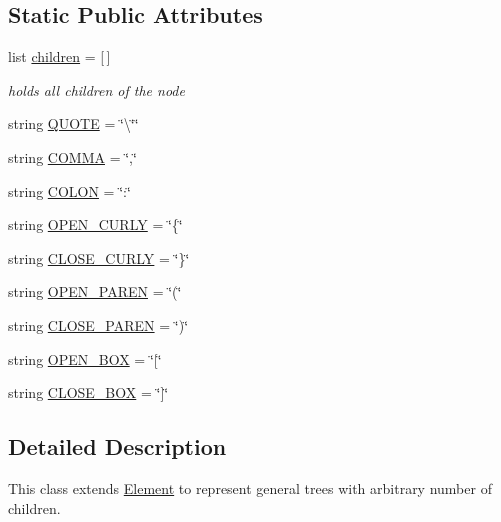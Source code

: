 \subsection*{Static Public Attributes}
\begin{DoxyCompactItemize}
\item 
list \hyperlink{class_tree_element_1_1_tree_element_ae0cb830d32da4af3e42635bc541c0d5d}{children} = \mbox{[}$\,$\mbox{]}
\begin{DoxyCompactList}\small\item\em holds all children of the node \end{DoxyCompactList}\item 
string \hyperlink{class_tree_element_1_1_tree_element_a65174e78fa3608767a4c39e3a57b3e7b}{Q\+U\+O\+T\+E} = \char`\"{}\textbackslash{}\char`\"{}\char`\"{}
\item 
string \hyperlink{class_tree_element_1_1_tree_element_a7c60e7e6b2932c777ff04e10a3743e71}{C\+O\+M\+M\+A} = \char`\"{},\char`\"{}
\item 
string \hyperlink{class_tree_element_1_1_tree_element_a969eb933243a09855f14255eaf4d277f}{C\+O\+L\+O\+N} = \char`\"{}\+:\char`\"{}
\item 
string \hyperlink{class_tree_element_1_1_tree_element_a8527e74740e4c2e04fdd4387f1cc89a9}{O\+P\+E\+N\+\_\+\+C\+U\+R\+L\+Y} = \char`\"{}\{\char`\"{}
\item 
string \hyperlink{class_tree_element_1_1_tree_element_a292bcded0f33007fa75ef0b9df22c268}{C\+L\+O\+S\+E\+\_\+\+C\+U\+R\+L\+Y} = \char`\"{}\}\char`\"{}
\item 
string \hyperlink{class_tree_element_1_1_tree_element_a543ac127f5fe123828075efe7de84eef}{O\+P\+E\+N\+\_\+\+P\+A\+R\+E\+N} = \char`\"{}(\char`\"{}
\item 
string \hyperlink{class_tree_element_1_1_tree_element_ae091d14c49001870c4ed738f363e1d3c}{C\+L\+O\+S\+E\+\_\+\+P\+A\+R\+E\+N} = \char`\"{})\char`\"{}
\item 
string \hyperlink{class_tree_element_1_1_tree_element_a0f49fc3331346c2ba3a8db5e50c1710a}{O\+P\+E\+N\+\_\+\+B\+O\+X} = \char`\"{}\mbox{[}\char`\"{}
\item 
string \hyperlink{class_tree_element_1_1_tree_element_a55eef8f9bbd59e13882c40d636e112cc}{C\+L\+O\+S\+E\+\_\+\+B\+O\+X} = \char`\"{}\mbox{]}\char`\"{}
\end{DoxyCompactItemize}


\subsection{Detailed Description}
This class extends \hyperlink{namespace_element}{Element} to represent general trees with arbitrary number of children. 

